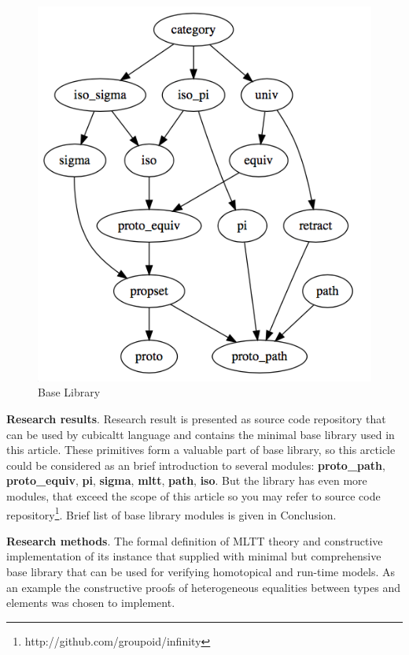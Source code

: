 \documentclass{svproc}
\begin{document}
\begin{figure}[h]
  \centerline{\includegraphics[scale=0.36]{baselib}}
  \caption{Base Library}
\end{figure}

{\bf Research results}. Research result is presented as source code repository that can be used by
cubicaltt language and contains the minimal base library used in this article.
These primitives form a valuable part of base library, so this arcticle could be
considered as an brief introduction to several modules: {\bf proto\_path}, {\bf proto\_equiv}, {\bf pi},
{\bf sigma}, {\bf mltt}, {\bf path}, {\bf iso}. But the library has even more modules, that
exceed the scope of this article so you may refer to source code
repository\footnote{http://github.com/groupoid/infinity}. Brief list of base library modules is given
in Conclusion.

{\bf Research methods}. The formal definition of MLTT theory and constructive
implementation of its instance that supplied with minimal but comprehensive base library that
can be used for verifying homotopical and run-time models. As an example the
constructive proofs of heterogeneous equalities between types and elements was chosen to implement.
\end{document}
